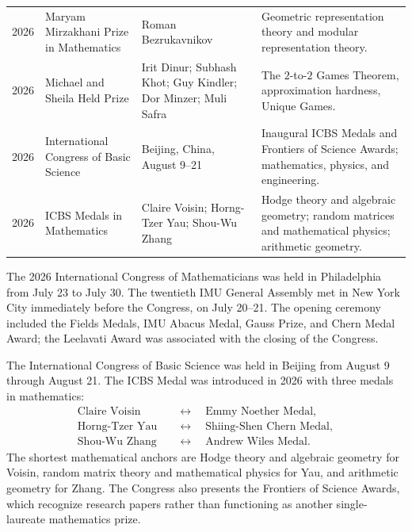 {\begin{longtable}{@{}L{0.08\textwidth}L{0.25\textwidth}L{0.27\textwidth}L{0.32\textwidth}@{}}
        2026
        & Maryam Mirzakhani Prize in Mathematics
        & Roman Bezrukavnikov
        & Geometric representation theory and modular representation theory. \\

        2026
        & Michael and Sheila Held Prize
        & Irit Dinur; Subhash Khot; Guy Kindler; Dor Minzer; Muli Safra
        & The $2$-to-$2$ Games Theorem, approximation hardness, Unique Games. \\

        2026
        & International Congress of Basic Science
        & Beijing, China, August 9--21
        & Inaugural ICBS Medals and Frontiers of Science Awards; mathematics,
          physics, and engineering. \\

        2026
        & ICBS Medals in Mathematics
        & Claire Voisin; Horng-Tzer Yau; Shou-Wu Zhang
        & Hodge theory and algebraic geometry; random matrices and mathematical
          physics; arithmetic geometry. \\
    \end{longtable}
    }

    \begin{fact}[2026 ICM]
        The 2026 International Congress of Mathematicians was held in
        Philadelphia from July 23 to July 30. The twentieth IMU General Assembly
        met in New York City immediately before the Congress, on July 20--21.
        The opening ceremony included the Fields Medals, IMU Abacus Medal, Gauss
        Prize, and Chern Medal Award; the Leelavati Award was associated with the
        closing of the Congress.
    \end{fact}

    \begin{fact}
        The International Congress of Basic Science was held in Beijing from
        August 9 through August 21. The ICBS Medal was introduced
        in 2026 with three medals in mathematics:
        \[
            \begin{aligned}
                \text{Claire Voisin}
                &\quad\longleftrightarrow\quad
                \text{Emmy Noether Medal},\\
                \text{Horng-Tzer Yau}
                &\quad\longleftrightarrow\quad
                \text{Shiing-Shen Chern Medal},\\
                \text{Shou-Wu Zhang}
                &\quad\longleftrightarrow\quad
                \text{Andrew Wiles Medal}.
            \end{aligned}
        \]
        The shortest mathematical anchors are Hodge theory and algebraic
        geometry for Voisin, random matrix theory and mathematical physics for
        Yau, and arithmetic geometry for Zhang. The Congress also presents the
        Frontiers of Science Awards, which recognize research papers rather than
        functioning as another single-laureate mathematics prize.
    \end{fact}

